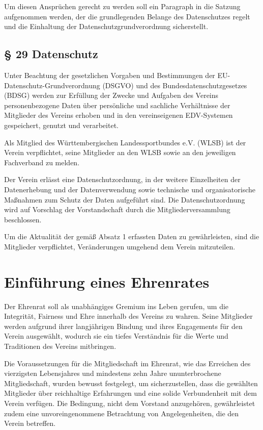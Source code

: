 \documentclass[10pt,a4paper,parskip=half]{scrartcl}
\newcommand{\change}[1]{
  \begin{adjustwidth}{20pt}{20pt}
    #1
  \end{adjustwidth}
}
\begin{document}
  Um diesen Ansprüchen gerecht zu werden soll ein Paragraph in die Satzung aufgenommen werden, der die grundlegenden Belange des Datenschutzes regelt und die Einhaltung der Datenschutzgrundverordnung sicherstellt.

  \change{
    \subsection*{§ 29 Datenschutz}

    Unter Beachtung der gesetzlichen Vorgaben und Bestimmungen der EU\--Daten\-schutz\--Grund\-verordnung (DSGVO) und des Bundes\-datenschutz\-gesetzes (BDSG) werden zur Erfüllung der Zwecke und Aufgaben des Vereins personenbezogene Daten über persönliche und sachliche Verhältnisse der Mitglieder des Vereins erhoben und in den vereinseigenen EDV-Systemen gespeichert, genutzt und verarbeitet.

    Als Mitglied des Württembergischen Landessportbundes e.V. (WLSB) ist der Verein verpflichtet, seine Mitglieder an den WLSB sowie an den jeweiligen Fachverband zu melden.
    
    Der Verein erlässt eine Datenschutzordnung, in der weitere Einzelheiten der Datenerhebung und der Datenverwendung sowie technische und organisatorische Maßnahmen zum Schutz der Daten aufgeführt sind. Die Datenschutzordnung wird auf Vorschlag der Vorstandschaft durch die Mitgliederversammlung beschlossen.
    
    Um die Aktualität der gemäß Absatz 1 erfassten Daten zu gewährleisten,
    sind die Mitglieder verpflichtet, Veränderungen umgehend dem Verein mitzuteilen.
  }

  \section{Einführung eines Ehrenrates}
  Der Ehrenrat soll als unabhängiges Gremium ins Leben gerufen, um die Integrität, Fairness und Ehre innerhalb des Vereins zu wahren. Seine Mitglieder werden aufgrund ihrer langjährigen Bindung und ihres Engagements für den Verein ausgewählt, wodurch sie ein tiefes Verständnis für die Werte und Traditionen des Vereins mitbringen.

  Die Voraussetzungen für die Mitgliedschaft im Ehrenrat, wie das Erreichen des vierzigsten Lebensjahres und mindestens zehn Jahre ununterbrochene Mitgliedschaft, wurden bewusst festgelegt, um sicherzustellen, dass die gewählten Mitglieder über reichhaltige Erfahrungen und eine solide Verbundenheit mit dem Verein verfügen. Die Bedingung, nicht dem Vorstand anzugehören, gewährleistet zudem eine unvoreingenommene Betrachtung von Angelegenheiten, die den Verein betreffen.
\end{document}
